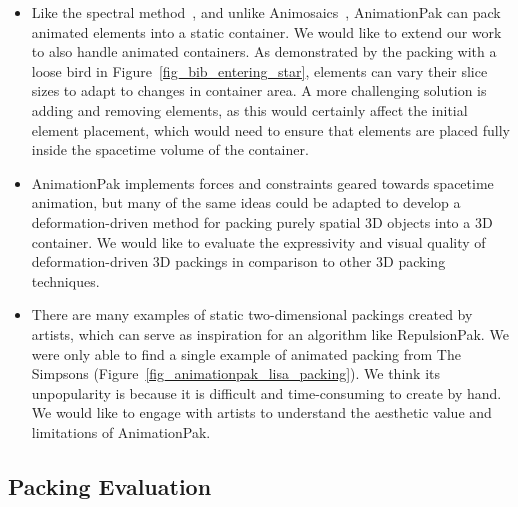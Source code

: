 \begin{itemize}
\item {}
Like the spectral method~\cite{Dalal2006}, and unlike
	Animosaics~\cite{Smith2005}, AnimationPak can pack animated 
	elements into a static container.  We would like to extend
	our work to also handle animated containers. 
	\newtext
	{
	As demonstrated by the packing with a loose bird in Figure~\ref{fig_bib_entering_star},
	elements can vary their slice sizes to adapt to changes in container area.
	A more challenging solution is adding and removing elements,
	as this would certainly affect the initial element placement, which 
	would need to ensure that elements are placed fully inside the
	spacetime volume of the container.  		
	}

\item {}
AnimationPak implements forces and constraints geared towards 
	spacetime animation, but many of the same ideas could be adapted
	to develop a deformation-driven method for packing purely spatial
	3D objects into a 3D container.  We would like to evaluate the
	expressivity and visual quality of deformation-driven 3D packings 
	in comparison to other 3D packing techniques.

\item {}
There are many examples of static two-dimensional packings
	created by artists, which can serve as inspiration for an algorithm like RepulsionPak.  
	We were only able to find a single example of animated packing from The Simpsons (Figure~\ref{fig_animationpak_lisa_packing}). 
	We think its unpopularity is because it is difficult and time-consuming to create by hand.
	We would like to engage with artists to understand the aesthetic value and limitations
	of AnimationPak.

\end{itemize}

\subsection{Packing Evaluation}

